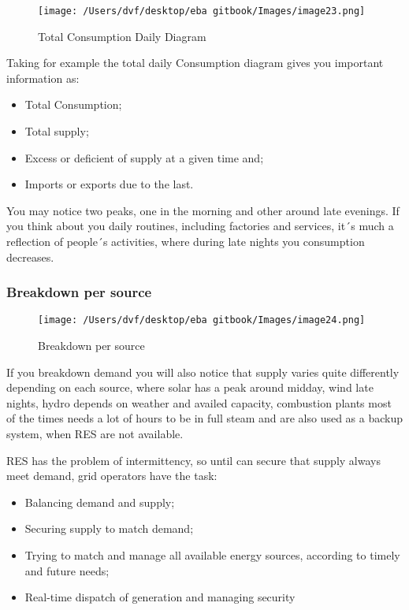 \documentclass[]{book}
\providecommand{\tightlist}{%
  \setlength{\itemsep}{0pt}\setlength{\parskip}{0pt}}
\theoremstyle{definition}
\theoremstyle{definition}
\theoremstyle{definition}
\theoremstyle{remark}
\begin{document}
\begin{figure}[htbp]
\centering
\texttt{[image: /Users/dvf/desktop/eba gitbook/Images/image23.png]}
\caption{Total Consumption Daily Diagram}
\end{figure}

Taking for example the total daily Consumption diagram gives you
important information as:

\begin{itemize}
\tightlist
\item
  Total Consumption;
\item
  Total supply;
\item
  Excess or deficient of supply at a given time and;
\item
  Imports or exports due to the last.
\end{itemize}

You may notice two peaks, one in the morning and other around late
evenings. If you think about you daily routines, including factories and
services, it´s much a reflection of people´s activities, where during
late nights you consumption decreases.

\subsubsection{Breakdown per source}\label{breakdown-per-source}

\begin{figure}[htbp]
\centering
\texttt{[image: /Users/dvf/desktop/eba gitbook/Images/image24.png]}
\caption{Breakdown per source}
\end{figure}

If you breakdown demand you will also notice that supply varies quite
differently depending on each source, where solar has a peak around
midday, wind late nights, hydro depends on weather and availed capacity,
combustion plants most of the times needs a lot of hours to be in full
steam and are also used as a backup system, when RES are not available.

RES has the problem of intermittency, so until can secure that supply
always meet demand, grid operators have the task:

\begin{itemize}
\tightlist
\item
  Balancing demand and supply;
\item
  Securing supply to match demand;
\item
  Trying to match and manage all available energy sources, according to
  timely and future needs;
\item
  Real-time dispatch of generation and managing security
\end{itemize}
\end{document}
